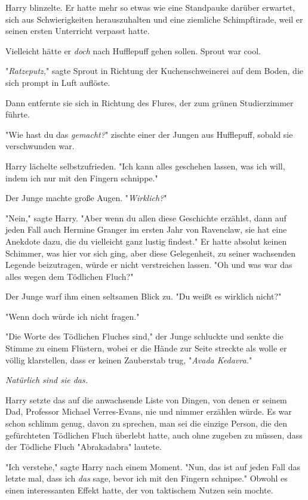 {Harry blinzelte. Er hatte mehr so etwas wie eine Standpauke darüber erwartet, sich aus Schwierigkeiten herauszuhalten und eine ziemliche Schimpftirade, weil er seinen ersten Unterricht verpasst hatte.

Vielleicht hätte er \emph{doch} nach Hufflepuff gehen sollen. Sprout war cool.

"\emph{Ratzeputz,}" sagte Sprout in Richtung der Kuchenschweinerei auf dem Boden, die sich prompt in Luft auflöste.

Dann entfernte sie sich in Richtung des Flures, der zum grünen Studierzimmer führte.

"Wie hast du das \emph{gemacht?}" zischte einer der Jungen aus Hufflepuff, sobald sie verschwunden war.

Harry lächelte selbstzufrieden. "Ich kann alles geschehen lassen, was ich will, indem ich nur mit den Fingern schnippe."

Der Junge machte große Augen. "\emph{Wirklich?}"

"Nein," sagte Harry. "Aber wenn du allen diese Geschichte erzählst, dann auf jeden Fall auch Hermine Granger im ersten Jahr von Ravenclaw, sie hat eine Anekdote dazu, die du vielleicht ganz lustig findest." Er hatte absolut keinen Schimmer, was hier vor sich ging, aber diese Gelegenheit, zu seiner wachsenden Legende beizutragen, würde er nicht verstreichen lassen. "Oh und was war das alles wegen dem Tödlichen Fluch?"

Der Junge warf ihm einen seltsamen Blick zu. "Du weißt es wirklich nicht?"

"Wenn doch würde ich nicht fragen."

"Die Worte des Tödlichen Fluches sind," der Junge schluckte und senkte die Stimme zu einem Flüstern, wobei er die Hände zur Seite streckte als wolle er völlig klarstellen, dass er keinen Zauberstab trug, "\emph{Avada Kedavra.}"

\emph{Natürlich sind sie das.}

Harry setzte das auf die anwachsende Liste von Dingen, von denen er seinem Dad, Professor Michael Verres-Evans, nie und nimmer erzählen würde. Es war schon schlimm genug, davon zu sprechen, man sei die einzige Person, die den gefürchteten Tödlichen Fluch überlebt hatte, auch ohne zugeben zu müssen, dass der Tödliche Fluch "Abrakadabra" lautete.

"Ich verstehe," sagte Harry nach einem Moment. "Nun, das ist auf jeden Fall das letzte mal, dass ich \emph{das} sage, bevor ich mit den Fingern schnipse." Obwohl es einen interessanten Effekt hatte, der von taktischem Nutzen sein mochte.

}
